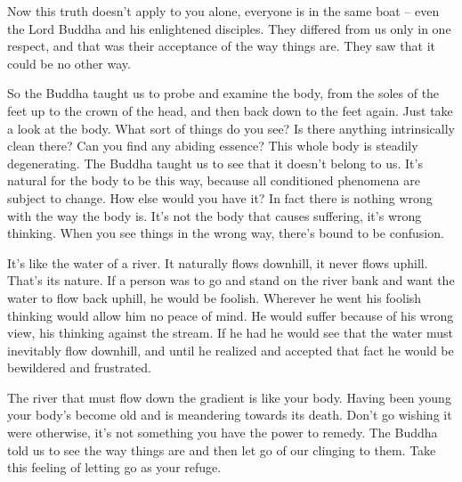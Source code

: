 Now this truth doesn't apply to you alone, everyone is in the same boat -- even the Lord Buddha and his enlightened disciples. They differed from us only in one respect, and that was their acceptance of the way things are. They saw that it could be no other way. 

So the Buddha taught us to probe and examine the body, from the soles of the feet up to the crown of the head, and then back down to the feet again. Just take a look at the body. What sort of things do you see? Is there anything intrinsically clean there? Can you find any abiding essence? This whole body is steadily degenerating. The Buddha taught us to see that it doesn't belong to us. It's natural for the body to be this way, because all conditioned phenomena are subject to change. How else would you have it? In fact there is nothing wrong with the way the body is. It's not the body that causes suffering, it's wrong thinking. When you see things in the wrong way, there's bound to be confusion. 

It's like the water of a river. It naturally flows downhill, it never flows uphill. That's its nature. If a person was to go and stand on the river bank and want the water to flow back uphill, he would be foolish. Wherever he went his foolish thinking would allow him no peace of mind. He would suffer because of his wrong view, his thinking against the stream. If he had  he would see that the water must inevitably flow downhill, and until he realized and accepted that fact he would be bewildered and frustrated. 

The river that must flow down the gradient is like your body. Having been young your body's become old and is meandering towards its death. Don't go wishing it were otherwise, it's not something you have the power to remedy. The Buddha told us to see the way things are and then let go of our clinging to them. Take this feeling of letting go as your refuge. 

